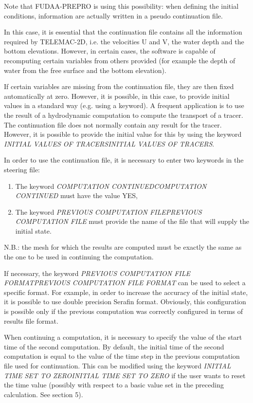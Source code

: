 \documentclass{article} %
\begin{document}
 Note that FUDAA-PREPRO is using this possibility: when defining the initial conditions, information are actually written in a pseudo continuation file.

 In this case, it is essential that the continuation file contains all the information required by TELEMAC-2D, i.e. the velocities U and V, the water depth and the bottom elevations. However, in certain cases, the software is capable of recomputing certain variables from others provided (for example the depth of water from the free surface and the bottom elevation).

 If certain variables are missing from the continuation file, they are then fixed automatically at zero. However, it is possible, in this case, to provide initial values in a standard way (e.g. using a keyword). A frequent application is to use the result of a hydrodynamic computation to compute the transport of a tracer. The continuation file does not normally contain any result for the tracer. However, it is possible to provide the initial value for this by using the keyword \textit{INITIAL VALUES OF TRACERSINITIAL VALUES OF TRACERS}.

 In order to use the continuation file, it is necessary to enter two keywords in the steering file:

\begin{enumerate}
\item  The keyword \textit{COMPUTATION CONTINUEDCOMPUTATION CONTINUED} must have the value YES,

\item  The keyword \textit{PREVIOUS COMPUTATION FILEPREVIOUS COMPUTATION FILE} must provide the name of the file that will supply the initial state.
\end{enumerate}

 N.B.: the mesh for which the results are computed must be exactly the same as the one to be used in continuing the computation.

 If necessary, the keyword \textit{PREVIOUS COMPUTATION FILE FORMATPREVIOUS COMPUTATION FILE FORMAT} can be used to select a specific format. For example, in order to increase the accuracy of the initial state, it is possible to use double precision Serafin format. Obviously, this configuration is possible only if the previous computation was correctly configured in terms of results file format.

 When continuing a computation, it is necessary to specify the value of the start time of the second computation. By default, the initial time of the second computation is equal to the value of the time step in the previous computation file used for continuation. This can be modified using the keyword \textit{INITIAL TIME SET TO ZEROINITIAL TIME SET TO ZERO} if the user wants to reset the time value (possibly with respect to a basic value set in the preceding calculation. See section 5).
\end{document}
